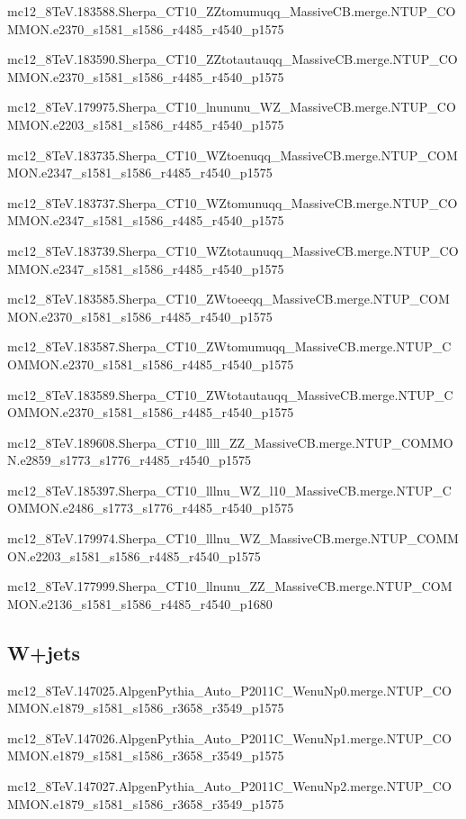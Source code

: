 mc12\_8TeV.183588.Sherpa\_CT10\_ZZtomumuqq\_MassiveCB.merge.NTUP\_COMMON.e2370\_s1581\_s1586\_r4485\_r4540\_p1575

mc12\_8TeV.183590.Sherpa\_CT10\_ZZtotautauqq\_MassiveCB.merge.NTUP\_COMMON.e2370\_s1581\_s1586\_r4485\_r4540\_p1575

mc12\_8TeV.179975.Sherpa\_CT10\_lnununu\_WZ\_MassiveCB.merge.NTUP\_COMMON.e2203\_s1581\_s1586\_r4485\_r4540\_p1575

mc12\_8TeV.183735.Sherpa\_CT10\_WZtoenuqq\_MassiveCB.merge.NTUP\_COMMON.e2347\_s1581\_s1586\_r4485\_r4540\_p1575

mc12\_8TeV.183737.Sherpa\_CT10\_WZtomunuqq\_MassiveCB.merge.NTUP\_COMMON.e2347\_s1581\_s1586\_r4485\_r4540\_p1575

mc12\_8TeV.183739.Sherpa\_CT10\_WZtotaunuqq\_MassiveCB.merge.NTUP\_COMMON.e2347\_s1581\_s1586\_r4485\_r4540\_p1575

mc12\_8TeV.183585.Sherpa\_CT10\_ZWtoeeqq\_MassiveCB.merge.NTUP\_COMMON.e2370\_s1581\_s1586\_r4485\_r4540\_p1575

mc12\_8TeV.183587.Sherpa\_CT10\_ZWtomumuqq\_MassiveCB.merge.NTUP\_COMMON.e2370\_s1581\_s1586\_r4485\_r4540\_p1575

mc12\_8TeV.183589.Sherpa\_CT10\_ZWtotautauqq\_MassiveCB.merge.NTUP\_COMMON.e2370\_s1581\_s1586\_r4485\_r4540\_p1575

mc12\_8TeV.189608.Sherpa\_CT10\_llll\_ZZ\_MassiveCB.merge.NTUP\_COMMON.e2859\_s1773\_s1776\_r4485\_r4540\_p1575

mc12\_8TeV.185397.Sherpa\_CT10\_lllnu\_WZ\_l10\_MassiveCB.merge.NTUP\_COMMON.e2486\_s1773\_s1776\_r4485\_r4540\_p1575

mc12\_8TeV.179974.Sherpa\_CT10\_lllnu\_WZ\_MassiveCB.merge.NTUP\_COMMON.e2203\_s1581\_s1586\_r4485\_r4540\_p1575

mc12\_8TeV.177999.Sherpa\_CT10\_llnunu\_ZZ\_MassiveCB.merge.NTUP\_COMMON.e2136\_s1581\_s1586\_r4485\_r4540\_p1680


\subsection{W+jets}
    mc12\_8TeV.147025.AlpgenPythia\_Auto\_P2011C\_WenuNp0.merge.NTUP\_COMMON.e1879\_s1581\_s1586\_r3658\_r3549\_p1575

    mc12\_8TeV.147026.AlpgenPythia\_Auto\_P2011C\_WenuNp1.merge.NTUP\_COMMON.e1879\_s1581\_s1586\_r3658\_r3549\_p1575

    mc12\_8TeV.147027.AlpgenPythia\_Auto\_P2011C\_WenuNp2.merge.NTUP\_COMMON.e1879\_s1581\_s1586\_r3658\_r3549\_p1575

